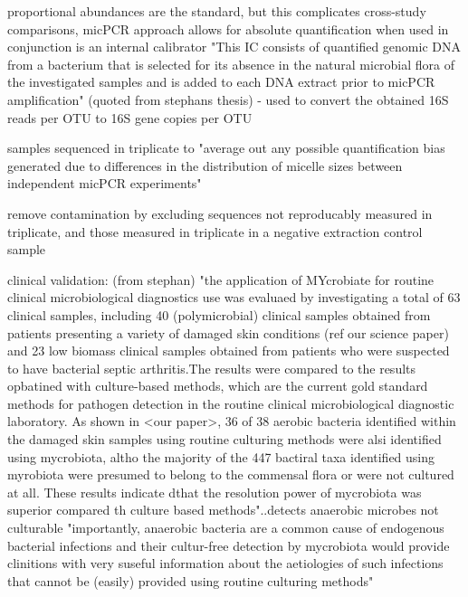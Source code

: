 proportional abundances are the standard, but this complicates cross-study comparisons, micPCR approach allows for absolute quantification when used in conjunction is an internal calibrator "This IC consists of quantified genomic DNA from a bacterium that is selected for its absence in the natural microbial flora of the investigated samples and is added to each DNA extract prior to micPCR amplification" (quoted from stephans thesis) - used to convert  the obtained 16S reads per OTU to 16S gene copies per OTU

samples sequenced in triplicate to "average out any possible quantification bias generated due to differences in the distribution of micelle sizes between independent micPCR experiments"

remove contamination by excluding sequences not reproducably measured in triplicate, and those measured in triplicate in a negative extraction control sample

clinical validation: (from stephan) "the application of MYcrobiate for routine clinical microbiological diagnostics use was evaluaed by investigating a total of 63 clinical samples, including 40 (polymicrobial) clinical samples obtained from patients presenting a variety of damaged skin conditions (ref our science paper) and 23 low biomass clinical samples obtained from patients who were suspected to have bacterial septic arthritis.The results were compared to the results opbatined with culture-based methods, which are the current gold standard methods for pathogen detection in the routine clinical microbiological diagnostic laboratory.
As shown in <our paper>, 36 of 38 aerobic bacteria identified within the damaged skin samples using routine culturing methods were alsi identified using mycrobiota, altho the majority of the 447 bactiral taxa identified using myrobiota were presumed to belong to the commensal flora or were not cultured at all. These results indicate dthat the resolution power of mycrobiota was superior compared th culture based methods"..detects anaerobic microbes not culturable "importantly, anaerobic bacteria are a common cause of endogenous bacterial infections and their cultur-free detection by mycrobiota would provide clinitions with very suseful information about the aetiologies of such infections that cannot be (easily) provided using routine culturing methods"

